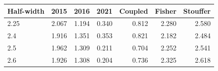 \begin{center}\small\begin{tabular}{lrrrrrr}\toprule
Half-width & 2015 & 2016 & 2021 & Coupled & Fisher & Stouffer\\\midrule
2.25 & 2.067 & 1.194 & 0.340 & 0.812 & 2.280 & 2.580\\
2.4 & 1.916 & 1.351 & 0.353 & 0.821 & 2.182 & 2.484\\
2.5 & 1.962 & 1.309 & 0.211 & 0.704 & 2.252 & 2.541\\
2.6 & 1.926 & 1.308 & 0.204 & 0.736 & 2.325 & 2.618\\
\bottomrule\end{tabular}\end{center}
